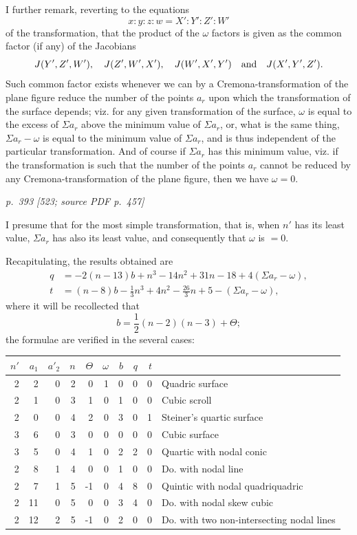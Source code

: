\documentclass[11pt,a4paper]{article}
\newcommand{\pagemarker}[3]{\par\bigskip\noindent\textit{p.~#1 [#2; source PDF p.~#3]}\par\smallskip}
\begin{document}
I further remark, reverting to the equations
\[
x:y:z:w=X':Y':Z':W'
\]
of the transformation, that the product of the $\omega$ factors is given as the common
factor (if any) of the Jacobians
\[
J(Y',Z',W'),\quad J(Z',W',X'),\quad J(W',X',Y')\quad\hbox{and}\quad
J(X',Y',Z').
\]
Such common factor exists whenever we can by a Cremona-transformation of the plane
figure reduce the number of the points $a_r$ upon which the transformation of the
surface depends; viz. for any given transformation of the surface, $\omega$ is equal to
the excess of $\Sigma a_r$ above the minimum value of $\Sigma a_r$, or, what is the same
thing, $\Sigma a_r-\omega$ is equal to the minimum value of $\Sigma a_r$, and is thus
independent of the particular transformation. And of course if $\Sigma a_r$ has this
minimum value, viz. if the transformation is such that the number of the points $a_r$
cannot be reduced by any Cremona-transformation of the plane figure, then we have
$\omega=0$.

\pagemarker{393}{523}{457}

I presume that for the most simple transformation, that is, when $n'$ has its least
value, $\Sigma a_r$ has also its least value, and consequently that $\omega$ is $=0$.

Recapitulating, the results obtained are
\[
\begin{aligned}
q&=-2(n-13)b+n^3-14n^2+31n-18+4(\Sigma a_r-\omega),\\
t&=(n-8)b-\frac13 n^3+4n^2-\frac{26}{3}n+5-(\Sigma a_r-\omega),
\end{aligned}
\]
where it will be recollected that
\[
b=\frac12(n-2)(n-3)+\Theta;
\]
the formulae are verified in the several cases:

\begin{center}
\begin{tabular}{rrrrrrrrrl}
\toprule
$n'$ & $a_1$ & $a'_2$ & $n$ & $\Theta$ & $\omega$ & $b$ & $q$ & $t$ & \\
\midrule
2& 2&0&2& 0&1&0&0&0& Quadric surface\\
2& 1&0&3& 1&0&1&0&0& Cubic scroll\\
2& 0&0&4& 2&0&3&0&1& Steiner's quartic surface\\
3& 6&0&3& 0&0&0&0&0& Cubic surface\\
3& 5&0&4& 1&0&2&2&0& Quartic with nodal conic\\
2& 8&1&4& 0&0&1&0&0& Do. with nodal line\\
2& 7&1&5&-1&0&4&8&0& Quintic with nodal quadriquadric\\
2&11&0&5& 0&0&3&4&0& Do. with nodal skew cubic\\
2&12&2&5&-1&0&2&0&0& Do. with two non-intersecting nodal lines\\
\bottomrule
\end{tabular}
\end{center}
\end{document}
